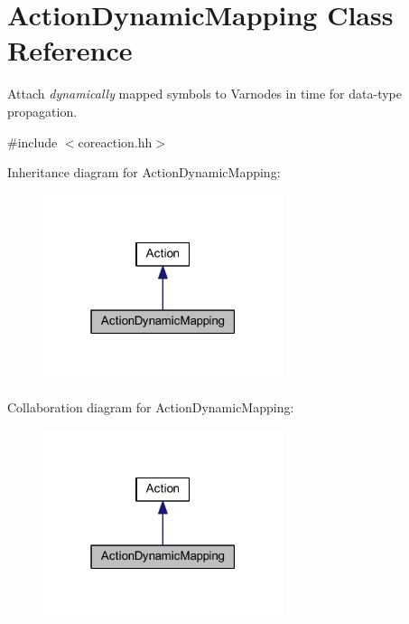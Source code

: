 \hypertarget{class_action_dynamic_mapping}{}\section{Action\+Dynamic\+Mapping Class Reference}
\label{class_action_dynamic_mapping}


Attach {\itshape dynamically} mapped symbols to Varnodes in time for data-\/type propagation.  




{\ttfamily \#include $<$coreaction.\+hh$>$}



Inheritance diagram for Action\+Dynamic\+Mapping\+:
\nopagebreak
\begin{figure}[H]
\begin{center}
\leavevmode
\includegraphics[width=199pt]{class_action_dynamic_mapping__inherit__graph}
\end{center}
\end{figure}


Collaboration diagram for Action\+Dynamic\+Mapping\+:
\nopagebreak
\begin{figure}[H]
\begin{center}
\leavevmode
\includegraphics[width=199pt]{class_action_dynamic_mapping__coll__graph}
\end{center}
\end{figure}
